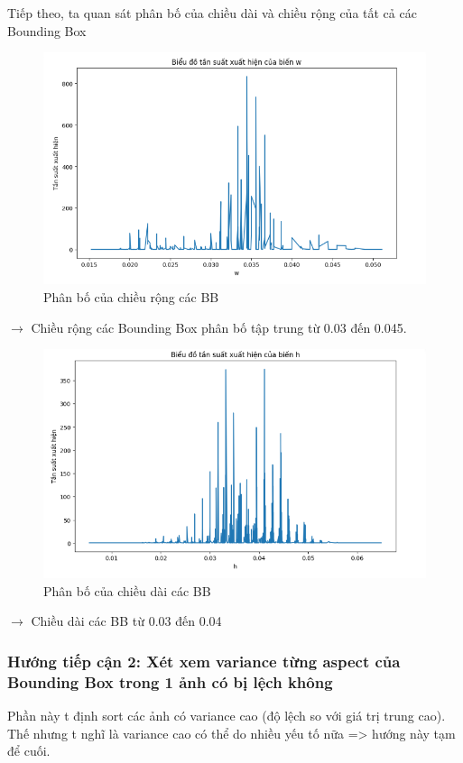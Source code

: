 \documentclass[a4paper,12pt]{article}
\begin{document}
Tiếp theo, ta quan sát phân bố của chiều dài và chiều rộng của tất cả các Bounding Box
\begin{figure}[ht]
    \centering
    \includegraphics[width=1\linewidth]{images/HistoW_train.png}
    \caption{Phân bố của chiều rộng các BB}
\end{figure}
$\rightarrow$ Chiều rộng các Bounding Box phân bố tập trung từ 0.03 đến 0.045.
\\
\begin{figure}[ht]
    \centering
    \includegraphics[width=1\linewidth]{images/HistoH_train.png}
    \caption{Phân bố của chiều dài các BB}
\end{figure}
$\rightarrow$ Chiều dài các BB từ 0.03 đến 0.04
\subsubsection{Hướng tiếp cận 2: Xét xem variance từng aspect của Bounding Box trong 1 ảnh có bị lệch không}
Phần này t định sort các ảnh có variance cao (độ lệch so với giá trị trung cao). Thế nhưng t nghĩ là variance cao có thể do nhiều yếu tố nữa => hướng này tạm để cuối.
\end{document}
